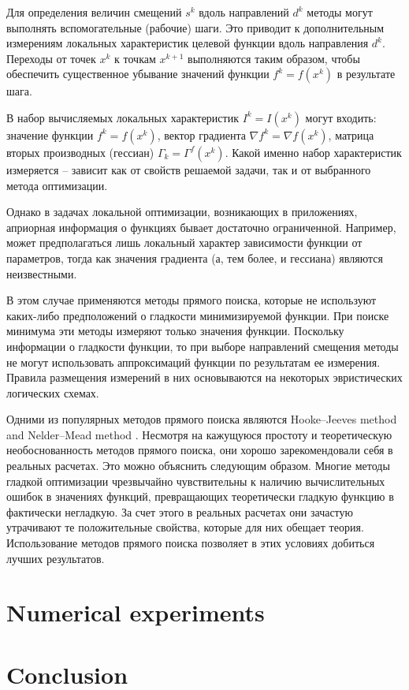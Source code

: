 \documentclass{svproc}
\begin{document}
Для определения величин смещений $s^k$ вдоль направлений $d^k$ методы могут выполнять вспомогательные (рабочие) шаги. Это приводит к дополнительным измерениям локальных характеристик целевой функции вдоль направления $d^k$. Переходы от точек $x^k$ к точкам $x^{k+1}$ выполняются таким образом, чтобы обеспечить существенное убывание значений функции $f^k = f( x^k )$ в результате шага.

В набор вычисляемых локальных характеристик $I^k=I(x^k)$ могут входить: значение функции $f^k = f( x^k )$, вектор градиента $\nabla f^k = \nabla f(x^k)$, матрица вторых производных (гессиан) $\Gamma_k=\Gamma^f(x^k)$. Какой именно набор характеристик измеряется -- зависит как от свойств решаемой задачи, так и от выбранного метода оптимизации.

Однако в задачах локальной оптимизации, возникающих в приложениях, априорная информация о функциях бывает достаточно ограниченной. Например, может предполагаться лишь локальный характер зависимости функции от параметров, тогда как значения градиента (а, тем более, и гессиана) являются неизвестными. 

В этом случае применяются методы прямого поиска, которые не используют каких-либо предположений о гладкости минимизируемой функции. При поиске минимума эти методы измеряют только значения функции. Поскольку информации о гладкости функции, то при выборе направлений смещения методы не могут использовать аппроксимаций функции по результатам ее измерения. Правила размещения измерений в них основываются на некоторых эвристических логических схемах. 

Одними из популярных методов прямого поиска являются Hooke--Jeeves method \cite{HookJeeves} and Nelder--Mead method \cite{NelderMead}. Несмотря на кажущуюся простоту и теоретическую необоснованность методов прямого поиска, они хорошо зарекомендовали себя в реальных расчетах. Это можно объяснить следующим образом. Многие методы гладкой оптимизации чрезвычайно чувствительны к наличию вычислительных ошибок в значениях функций, превращающих теоретически гладкую функцию в фактически негладкую. За счет этого в реальных расчетах они зачастую утрачивают те положительные свойства, которые для них обещает теория. Использование методов прямого поиска позволяет в этих условиях добиться лучших результатов.







\section{Numerical experiments}


\section{Conclusion}

%
%

{}
\end{document}
